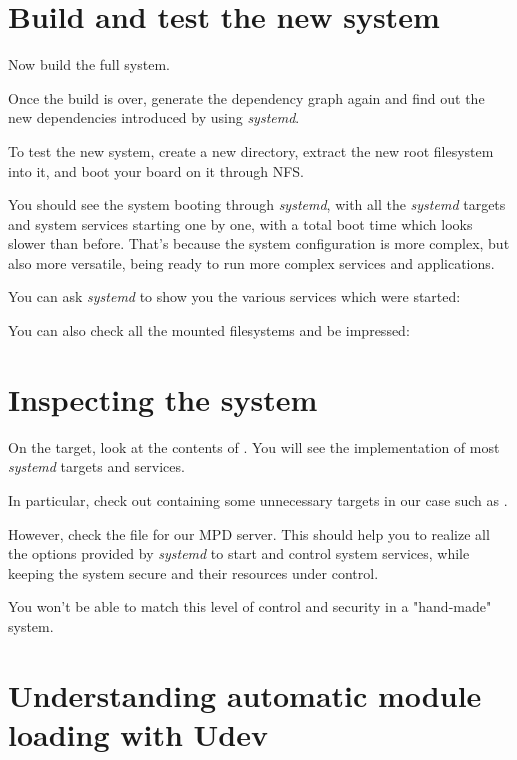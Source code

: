 \section{Build and test the new system}

Now build the full system.

Once the build is over, generate the dependency graph again and find out
the new dependencies introduced by using {\em systemd}.

To test the new system, create a new  directory, extract
the new root filesystem into it, and boot your board on it through NFS.

You should see the system booting through {\em systemd}, with all the
{\em systemd} targets and system services starting one by one, with a
total boot time which looks slower than before. That's because the
system configuration is more complex, but also more versatile, being
ready to run more complex services and applications.

You can ask {\em systemd} to show you the various services which were
started:


You can also check all the mounted filesystems and be impressed:


\section{Inspecting the system}

On the target, look at the contents of . You will
see the implementation of most {\em systemd} targets and services.

In particular, check out  containing
some unnecessary targets in our case such as .

However, check the  file for our MPD server.
This should help you to realize all the options provided
by {\em systemd} to start and control system services, while
keeping the system secure and their resources under control.

You won't be able to match this level of control and security in a
"hand-made" system.

\section{Understanding automatic module loading with Udev}

